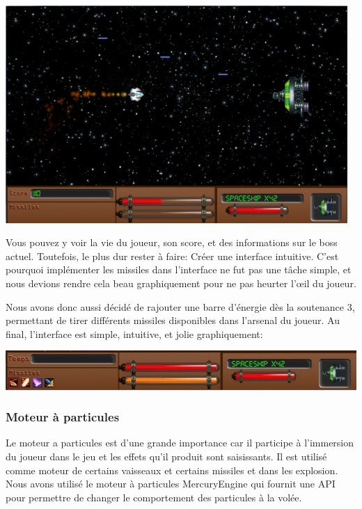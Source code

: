 \begin{center}
	\includegraphics[width=13cm]{images/hud1.png}
\end{center}   
   
\par Vous pouvez y voir la vie du joueur, son score, et des informations sur le boss actuel. Toutefois, le plus dur rester à faire: Créer une interface intuitive. C'est pourquoi implémenter les missiles dans l'interface ne fut pas une tâche simple, et nous devions rendre cela beau graphiquement pour ne pas heurter l'œil du joueur.
\par Nous avons donc aussi décidé de rajouter une barre d'énergie dès la soutenance 3, permettant de tirer différents missiles disponibles dans l'arsenal du joueur. Au final, l'interface est simple, intuitive, et jolie graphiquement:

\begin{center}
	\includegraphics[width=15cm]{images/interface.jpg}
\end{center}

\subsubsection{Moteur à particules}
Le moteur a particules est d'une grande importance car il participe à l'immersion du joueur dans le jeu et les effets qu'il produit sont saisissants. Il est utilisé comme moteur de certains vaisseaux et certains missiles et dans les explosion.
Nous avons utilisé le moteur à particules MercuryEngine qui fournit une API pour permettre de changer le comportement des particules à la volée.
